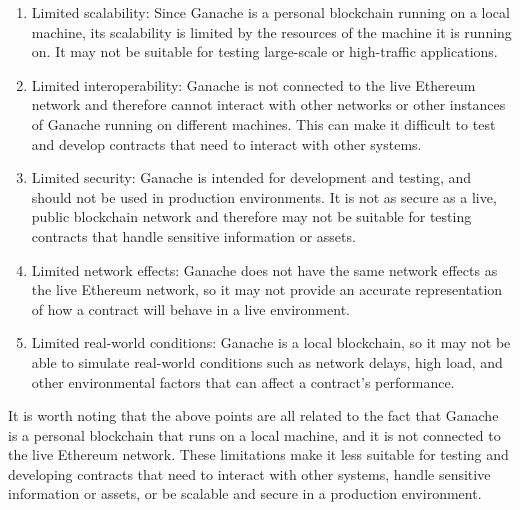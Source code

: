 \documentclass[target=mst,aauheader=]{thud}
\begin{document}
\begin{enumerate}

    \item Limited scalability: Since Ganache is a personal blockchain running on a local machine, its scalability is limited by the resources of the machine it is running on. It may not be suitable for testing large-scale or high-traffic applications.
    \item Limited interoperability: Ganache is not connected to the live Ethereum network and therefore cannot interact with other networks or other instances of Ganache running on different machines. This can make it difficult to test and develop contracts that need to interact with other systems.
    \item Limited security: Ganache is intended for development and testing, and should not be used in production environments. It is not as secure as a live, public blockchain network and therefore may not be suitable for testing contracts that handle sensitive information or assets.
    \item Limited network effects: Ganache does not have the same network effects as the live Ethereum network, so it may not provide an accurate representation of how a contract will behave in a live environment.
    \item Limited real-world conditions: Ganache is a local blockchain, so it may not be able to simulate real-world conditions such as network delays, high load, and other environmental factors that can affect a contract's performance.

\end{enumerate}

It is worth noting that the above points are all related to the fact that Ganache is a personal blockchain that runs on a local machine, and it is not connected to the live Ethereum network. These limitations make it less suitable for testing and developing contracts that need to interact with other systems, handle sensitive information or assets, or be scalable and secure in a production environment.

\backmatter

\end{document}
